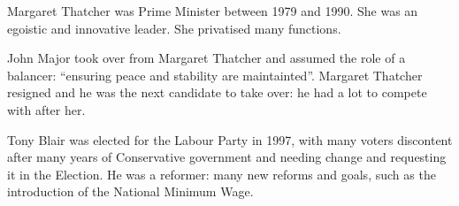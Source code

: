 \documentclass[12pt]{article}
\begin{document}
	
	Margaret Thatcher was Prime Minister between 1979 and 1990.  She was an egoistic and innovative leader.  She privatised many functions.
	
	John Major took over from Margaret Thatcher and assumed the role of a balancer: ``ensuring peace and stability are maintainted''.  Margaret Thatcher resigned and he was the next candidate to take over: he had a lot to compete with after her.
	
	Tony Blair was elected for the Labour Party in 1997, with many voters discontent after many years of Conservative government and needing change and requesting it in the Election.  He was a reformer: many new reforms and goals, such as the introduction of the National Minimum Wage.  
	
\end{document}
